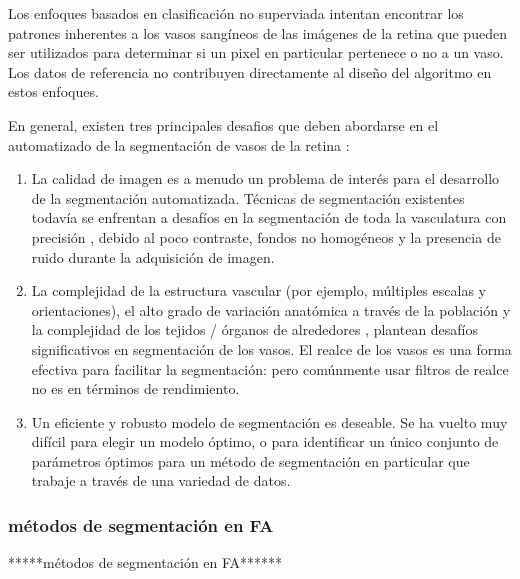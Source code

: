 Los enfoques basados en clasificaci\'on no superviada intentan encontrar los patrones inherentes a los vasos sang\'ineos de las im\'agenes de la retina que pueden ser utilizados para determinar si un pixel en particular pertenece o no a un vaso. Los datos de referencia no contribuyen directamente al dise\~no del algoritmo en estos enfoques.

En general, existen tres principales desafios que deben abordarse en el automatizado de la segmentación de vasos de la retina :
\begin{enumerate}
\item La calidad de imagen es a menudo un problema de interés para el desarrollo de la segmentación automatizada. Técnicas de segmentación existentes todavía se enfrentan a desafíos en la segmentación de toda la vasculatura con precisión , debido al poco contraste, fondos no homogéneos y la presencia de ruido durante la adquisición de imagen.
\item La complejidad de la estructura vascular (por ejemplo, múltiples escalas y orientaciones), el alto grado de variación anatómica a través de la población y la complejidad de los tejidos / órganos de alrededores
, plantean desafíos significativos en segmentación de los vasos. El realce de los vasos es
una forma efectiva para facilitar la segmentación:  pero comúnmente usar filtros de realce no es en términos de rendimiento.
\item Un eficiente y robusto modelo de segmentación  es deseable. Se ha vuelto muy difícil
para elegir un modelo óptimo, o para identificar un único conjunto de parámetros óptimos para un método de segmentación en particular que trabaje a través de una variedad de datos.\cite{zhao2015retinal}
\end{enumerate}



\subsubsection{métodos de segmentación en FA}
*****métodos de segmentación en FA******
